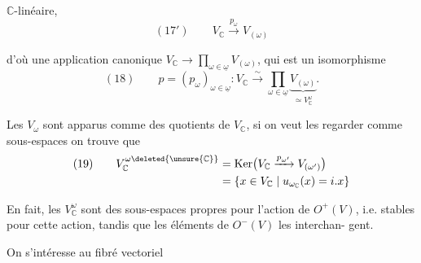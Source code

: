 
$\mathbb C$-linéaire, 
\[
(17')\qquad V_{\mathbb C}\xrightarrow{p_\omega}V_{(\omega)}
\]

d’où une application  canonique
$V_{\mathbb C}\longrightarrow\prod_{\omega\in\underline\omega}V_{(\omega)}$,
qui est un isomorphisme
\[
(18)\qquad p=(p_\omega)_{\omega\in\underline\omega}:
V_{\mathbb C}\xrightarrow{\sim}\prod_{\omega\in\underline\omega}
\underbrace{V_{(\omega)}}_{\simeq V_{\mathbb C}^{\omega}}.
\]

Les $V_{\omega}$ sont apparus comme
des quotients de $V_{\mathbb C}$, si on veut les
regarder comme sous-espaces on trouve
que
\[
\begin{aligned}
(19)\qquad V_{\mathbb C}^{\omega\deleted{\unsure{\mathbb C}}}
&=\operatorname{Ker}\bigl(V_{\mathbb C}\xrightarrow{p_{\omega'}}V_{(\omega')}\bigr)\\
&=\{x\in V_{\mathbb C}\mid u_{\omega_{\mathbb C}}(x)=i.x\}
\end{aligned}
\]

En fait, les $V_{\mathbb C}^{\omega}$\inserted{$(\omega\in\underline\omega)$} sont des sous-espaces
propres pour l’action de $O^+(V)$, i.e.
stables pour cette action, tandis que
les éléments de $O^-(V)$ les interchan-
gent.

On s’intéresse au fibré vectoriel

